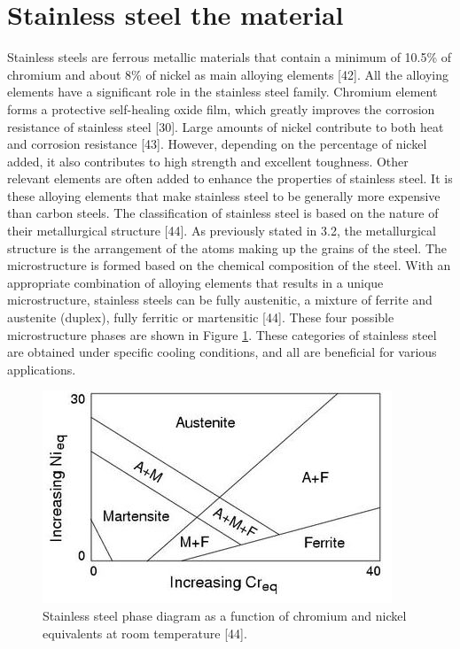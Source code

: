 \documentclass[12pt]{report}
\begin{document}
\section{Stainless steel the material} 
Stainless steels are ferrous metallic materials that contain a minimum of 10.5\% of chromium and about 8\% of nickel as main alloying elements [42]. All the alloying elements have a significant role in the stainless steel family. Chromium element forms a protective self-healing oxide film, which greatly improves the corrosion resistance of stainless steel [30]. Large amounts of nickel contribute to both heat and corrosion resistance [43]. However, depending on the percentage of nickel added, it also contributes to high strength and excellent toughness. Other relevant elements are often added to enhance the properties of stainless steel. It is these alloying elements that make stainless steel to be generally more expensive than carbon steels.
The classification of stainless steel is based on the nature of their metallurgical structure [44]. As previously stated in 3.2, the metallurgical structure is the arrangement of the atoms making up the grains of the steel. The microstructure is formed based on the chemical composition of the steel. With an appropriate combination of alloying elements that results in a unique microstructure, stainless steels can be fully austenitic, a mixture of ferrite and austenite (duplex), fully ferritic or martensitic [44]. These four possible microstructure phases are shown in Figure \ref{ch3:figure:steel}. These categories of stainless steel are obtained under specific cooling conditions, and all are beneficial for various applications.
 
\begin{figure}[H]
    \centering
    \includegraphics[width=.65\textwidth]{stainless_steel_phase.jpg}
    \caption{Stainless steel phase diagram as a function of chromium and nickel equivalents at room temperature [44].}
    \label{ch3:figure:steel}
\end{figure}
\end{document}
